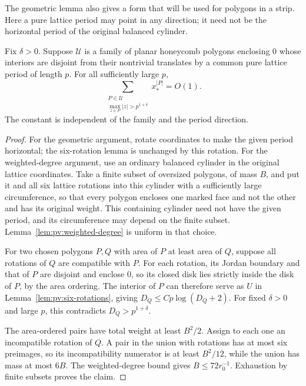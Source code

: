 The geometric lemma also gives a form that will be used for polygons in a
strip. Here a pure lattice period may point in any direction; it need not
be the horizontal period of the original balanced cylinder.

\begin{corollary}\label{cor:pv:oversized-polygons}
Fix \(\delta>0\). Suppose \(\mathcal U\) is a family of planar honeycomb
polygons enclosing 0 whose interiors are disjoint from their nontrivial
translates by a common pure lattice period of length \(p\). For all
sufficiently large \(p\),
\[
 \sum_{\substack{P\in\mathcal U\\
             \max_{z\in P}|z|>p^{1+\delta}}}x_*^{|P|}=O(1).
\]
The constant is independent of the family and the period direction.
\end{corollary}

\begin{proof}
For the geometric argument, rotate coordinates to make the given period
horizontal; the six-rotation lemma is unchanged by this rotation. For the
weighted-degree argument, use an ordinary balanced cylinder in the original
lattice coordinates. Take a finite subset of oversized polygons, of mass
\(B\), and put it and all six lattice rotations into this cylinder with a
sufficiently large circumference, so that every polygon encloses one marked
face and not the other and has its original weight. This containing cylinder
need not have the given period, and its circumference may depend on the
finite subset. Lemma~\ref{lem:pv:weighted-degree} is uniform in that choice.

For two chosen polygons \(P,Q\) with area of \(P\) at least area of \(Q\),
suppose all rotations of \(Q\) are compatible with \(P\). For each rotation,
its Jordan boundary and that of \(P\) are disjoint and enclose 0, so its
closed disk lies strictly inside the disk of \(P\), by the area ordering.
The interior of \(P\) can
therefore serve as \(U\) in Lemma~\ref{lem:pv:six-rotations}, giving
\(D_Q\le Cp\log(D_Q+2)\). For fixed \(\delta>0\) and large \(p\), this
contradicts \(D_Q>p^{1+\delta}\).

The area-ordered pairs have total weight at least \(B^2/2\). Assign to each
one an incompatible rotation of \(Q\). A pair in the union with rotations
has at most six preimages, so its incompatibility numerator is at least
\(B^2/12\), while the union has mass at most \(6B\). The weighted-degree
bound gives \(B\le72r_0^{-1}\). Exhaustion by finite subsets proves the
claim.
\end{proof}

